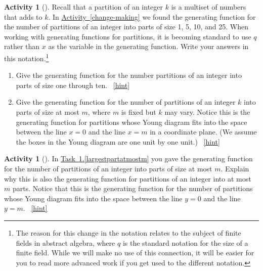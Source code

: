 \documentclass[10pt,]{book}
\theoremstyle{plain}
\theoremstyle{definition}
\theoremstyle{definition}
\theoremstyle{definition}
\newtheorem{activity}[project]{Activity}
\numberwithin{equation}{chapter}
\begin{document}
\begin{activity}[]\label{activity-310}
\hypertarget{p-1570}{}%
Recall that a partition of an integer \(k\) is a multiset of numbers that adds to \(k\). In \hyperref[change-making]{Activity~\ref{change-making}} we found the generating function for the number of partitions of an integer into parts of size 1, 5, 10, and 25. When working with generating functions for partitions, it is becoming standard to use \(q\) rather than \(x\) as the variable in the generating function.  Write your answers in this notation.\footnote{The reason for this change in the notation relates to the subject of finite fields in abstract algebra, where \(q\) is the standard notation for the size of a finite field.  While we will make no use of this connection, it will be easier for you to read more advanced work if you get used to the different notation.\label{fn-20}}%
\begin{enumerate}[font=\bfseries,label=(\alph*),ref=\alph*]
\item\label{task-271} \hypertarget{p-1571}{}%
Give the generating function for the number partitions of an integer into parts of size one through ten.%
~\hfill{\tiny\hyperlink{a-317.a}{[hint]}\hypertarget{q-317.a}{}}\item\label{largestpartatmostm} \hypertarget{p-1574}{}%
Give the generating function for the number of partitions of an integer \(k\) into parts of size at most \(m\), where \(m\) is fixed but \(k\) may vary. Notice this is the generating function for partitions whose Young diagram fits into the space between the line \(x=0\) and the line \(x=m\) in a coordinate plane. (We assume the boxes in the Young diagram are one unit by one unit.)%
~\hfill{\tiny\hyperlink{a-317.b}{[hint]}\hypertarget{q-317.b}{}}\end{enumerate}
\end{activity}
\begin{activity}[]\label{atmostmparts}
\hypertarget{p-1577}{}%
In \hyperref[largestpartatmostm]{Task~\ref{activity-310}.\ref{largestpartatmostm}} you gave the generating function for the number of partitions of an integer into parts of size at most \(m\). Explain why this is also the generating function for partitions of an integer into at most \(m\) parts. Notice that this is the generating function for the number of partitions whose Young diagram fits into the space between the line \(y=0\) and the line \(y=m\).%
~\hfill{\tiny\hyperlink{a-318}{[hint]}\hypertarget{q-318}{}}\end{activity}
\end{document}
